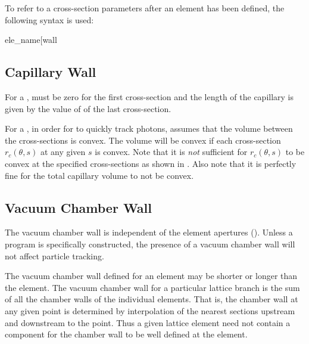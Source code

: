 To refer to a cross-section parameters after an element has been defined, the following syntax is
used:
\begin{example}
  ele_name[wall%
\end{example}

\subsection{Capillary Wall}
\label{s:wall.capillary}

For a ,  must be zero for the first cross-section and the length of the
capillary is given by the value of  of the last cross-section.

For a , in order for \bmad to quickly track photons, \bmad assumes that the volume
between the cross-sections is convex. The volume will be convex if each cross-section $r_c(\theta,
s)$ at any given $s$ is convex. Note that it is {\em not} sufficient for $r_c(\theta, s)$ to be
convex at the specified cross-sections as shown in . Also note that it is
perfectly fine for the total capillary volume to not be convex.

\subsection{Vacuum Chamber Wall}
\label{s:wall.vacuum}

The vacuum chamber wall is independent of the element apertures (). Unless a program
is specifically constructed, the presence of a vacuum chamber wall will not affect particle
tracking.

The vacuum chamber wall defined for an element may be shorter or longer than the element.  The
vacuum chamber wall for a particular lattice branch is the sum of all the chamber walls of the
individual elements. That is, the chamber wall at any given point is determined by interpolation of
the nearest sections upstream and downstream to the point.  Thus a given lattice element need not
contain a  component for the chamber wall to be well defined at the element.

